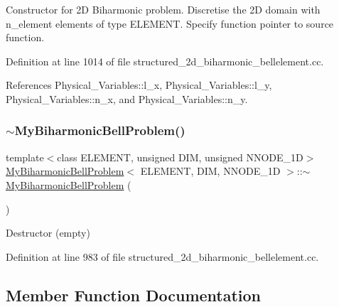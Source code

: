 Constructor for 2D Biharmonic problem. Discretise the 2D domain with n\+\_\+element elements of type E\+L\+E\+M\+E\+NT. Specify function pointer to source function. 

Definition at line 1014 of file structured\+\_\+2d\+\_\+biharmonic\+\_\+bellelement.\+cc.



References Physical\+\_\+\+Variables\+::l\+\_\+x, Physical\+\_\+\+Variables\+::l\+\_\+y, Physical\+\_\+\+Variables\+::n\+\_\+x, and Physical\+\_\+\+Variables\+::n\+\_\+y.

\mbox{\label{classMyBiharmonicBellProblem_aa81548287a36375d4e3841cf3d71489b}} 
\subsubsection{\texorpdfstring{$\sim$\+My\+Biharmonic\+Bell\+Problem()}{~MyBiharmonicBellProblem()}}
{\footnotesize\ttfamily template$<$class E\+L\+E\+M\+E\+NT, unsigned D\+IM, unsigned N\+N\+O\+D\+E\+\_\+1D$>$ \\
\hyperlink{classMyBiharmonicBellProblem}{My\+Biharmonic\+Bell\+Problem}$<$ E\+L\+E\+M\+E\+NT, D\+IM, N\+N\+O\+D\+E\+\_\+1D $>$\+::$\sim$\hyperlink{classMyBiharmonicBellProblem}{My\+Biharmonic\+Bell\+Problem} (\begin{DoxyParamCaption}{ }\end{DoxyParamCaption})\hspace{0.3cm}{\ttfamily [inline]}}



Destructor (empty) 



Definition at line 983 of file structured\+\_\+2d\+\_\+biharmonic\+\_\+bellelement.\+cc.



\subsection{Member Function Documentation}
\mbox{\label{classMyBiharmonicBellProblem_afbe1effa8e47ff655f99d8ec869eaa2f}} 
